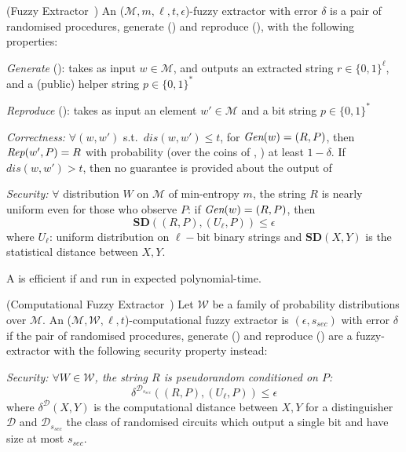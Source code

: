 \begin{definition}{(Fuzzy Extractor~\cite{compfe})}\label{def:feit}
An ($\mathcal{M},m,\ell,t,\epsilon$)-fuzzy extractor with error $\delta$ is a pair of randomised procedures, generate (\gen) and reproduce (\rep), with the following properties:

\textit{Generate} (\gen): takes as input $w \in \mathcal{M}$, and outputs an extracted string $r \in \{0,1\}^\ell$, and a (public) helper string $p\in\{0,1\}^*$

\textit{Reproduce} (\rep): takes as input an element $w' \in \mathcal{M}$ and a bit string $p\in\{0,1\}^*$

\textit{Correctness:} $\forall (w,w')$ s.t.\ $dis(w,w')\leq t$, for $\textit{Gen}(w)=(R,P)$, then $\textit{Rep}(w',P)=R$  with probability (over the coins of \gen, \rep) at least $1-\delta$. If $dis(w,w') > t$, then no guarantee is provided about the output of \rep 

\textit{Security:} $\forall$ distribution $W$ on $\mathcal{M}$ of min-entropy $m$, the string $R$ is nearly uniform even for those who observe $P$: if $\textit{Gen}(w)=(R,P)$, then
$$\mathbf{SD}((R,P),(U_\ell,P)) \leq \epsilon$$ 
where $U_\ell$: uniform distribution on $\ell-$bit binary strings and $\mathbf{SD}(X,Y)$ is the statistical distance between $X,Y$.

\end{definition}
A \fe is efficient if \gen and \rep run in expected polynomial-time.

\begin{definition}{(Computational Fuzzy Extractor~\cite{compfe})}\label{def:fec} Let $\mathcal{W}$ be a family of probability distributions over $\mathcal{M}$.
An ($\mathcal{M},\mathcal{W},\ell,t$)-computational fuzzy extractor is $(\epsilon,s_{sec})$ with error $\delta$ if the pair of randomised procedures, generate (\gen) and reproduce (\rep) are a fuzzy-extractor with the following security property instead:

\textit{Security: $\forall W \in \mathcal{W}$, the string $R$ is pseudorandom conditioned on $P$: $$\delta^{\mathcal{D}_{s_{sec}}}((R,P),(U_\ell,P))\leq \epsilon$$} 
where $\delta^{\mathcal{D}}(X,Y)$ is the computational distance between $X,Y$ for a distinguisher $\mathcal{D}$ and $\mathcal{D}_{s_{sec}}$ the class of randomised circuits which output a single bit and have size at most $s_{sec}$.

\end{definition}


